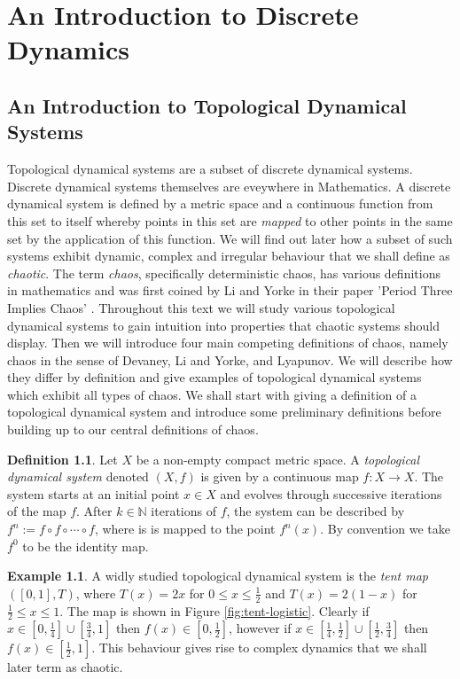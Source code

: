 \documentclass[11pt,a4paper,oneside]{memoir}
\theoremstyle{plain}
\theoremstyle{definition}
\newtheorem{defn}[thm]{Definition}
\newtheorem{exmp}[thm]{Example}
\begin{document}
\tableofcontents

\chapter{An Introduction to Discrete Dynamics}

\section{An Introduction to Topological Dynamical Systems} \label{sec:dynsys}

Topological dynamical systems are a subset of discrete dynamical systems. Discrete dynamical systems themselves are eveywhere in Mathematics. A discrete dynamical system is defined by a metric space and a continuous function from this set to itself whereby points in this set are \emph{mapped} to other points in the same set by the application of this function. We will find out later how a subset of such systems exhibit dynamic, complex and irregular behaviour that we shall define as \emph{chaotic}. The term \emph{chaos}, specifically deterministic chaos, has various definitions in mathematics and was first coined by Li and Yorke in their paper 'Period Three Implies Chaos' \cite{li-yorke}. Throughout this text we will study various topological dynamical systems to gain intuition into properties that chaotic systems should display. Then we will introduce four main competing definitions of chaos, namely chaos in the sense of Devaney, Li and Yorke, and Lyapunov. We will describe how they differ by definition and give examples of topological dynamical systems which exhibit all types of chaos. We shall start with giving a definition of a topological dynamical system and introduce some preliminary definitions before building up to our central definitions of chaos.

\begin{defn}
    Let $X$ be a non-empty compact metric space. A \emph{topological dynamical system} denoted $(X, f)$ is given by a continuous map $f: X \to X$. The system starts at an initial point $x \in X$ and evolves through successive iterations of the map $f$. After $k \in \mathbb{N}$ iterations of $f$, the system can be described by $f^n := f \circ f \circ \cdots \circ f$, where is is mapped to the point $f^n(x)$. By convention we take $f^0$ to be the identity map.
\end{defn}

\begin{exmp}
    A widly studied topological dynamical system is the \emph{tent map} $([0, 1], T)$, where $T(x) = 2x$ for $0 \leq x \leq \frac{1}{2}$ and $T(x) = 2(1-x)$ for $\frac{1}{2} \leq x \leq 1$. The map is shown in Figure \ref{fig:tent-logistic}. Clearly if $x \in \left[0, \frac{1}{4}\right] \cup \left[\frac{3}{4}, 1\right]$ then $f(x) \in \left[0, \frac{1}{2}\right]$, however if $x \in \left[\frac{1}{4}, \frac{1}{2}\right] \cup \left[\frac{1}{2}, \frac{3}{4}\right]$ then $f(x) \in \left[\frac{1}{2}, 1\right]$. This behaviour gives rise to complex dynamics that we shall later term as chaotic.
\end{exmp}
\end{document}
